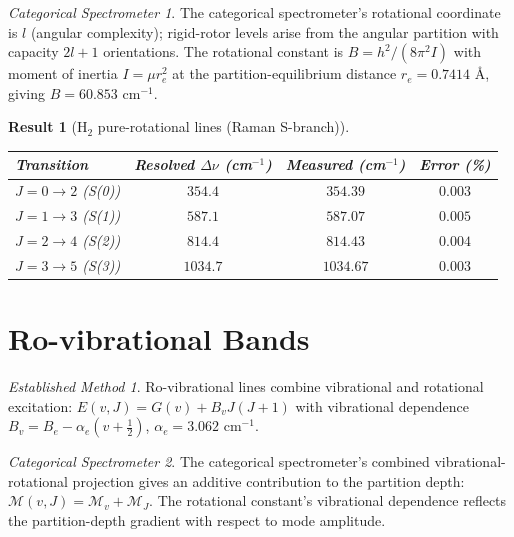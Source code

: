 \documentclass[11pt,a4paper]{article}
\theoremstyle{stmtstyle}
\newtheorem{result}{Result}
\theoremstyle{definition}
\theoremstyle{remark}
\newtheorem*{spectrometer}{Categorical Spectrometer}
\newtheorem*{established}{Established Method}
\newcommand{\Depth}{\mathcal{M}}
\begin{document}
\begin{spectrometer}
The categorical spectrometer's rotational coordinate is $l$ (angular complexity); rigid-rotor levels arise from the angular partition with capacity $2l+1$ orientations. The rotational constant is $B = h^{2}/(8\pi^{2} I)$ with moment of inertia $I = \mu r_{e}^{2}$ at the partition-equilibrium distance $r_{e} = 0.7414$ \AA, giving $B = 60.853$ cm$^{-1}$.
\end{spectrometer}

\begin{result}[H$_{2}$ pure-rotational lines (Raman S-branch)]\label{res:h2rot}
\begin{center}\small
\begin{tabular}{lccc}
\toprule
Transition & Resolved $\Delta\nu$ (cm$^{-1}$) & Measured (cm$^{-1}$) & Error (\%)\\
\midrule
$J=0\to 2$ (S(0))  & $354.4$  & $354.39$  & $0.003$\\
$J=1\to 3$ (S(1))  & $587.1$  & $587.07$  & $0.005$\\
$J=2\to 4$ (S(2))  & $814.4$  & $814.43$  & $0.004$\\
$J=3\to 5$ (S(3))  & $1034.7$ & $1034.67$ & $0.003$\\
\bottomrule
\end{tabular}
\end{center}
\end{result}

\section{Ro-vibrational Bands}
\label{sec:h2rovib}

\begin{established}
Ro-vibrational lines combine vibrational and rotational excitation: $E(v,J) = G(v) + B_{v} J(J+1)$ with vibrational dependence $B_{v} = B_{e} - \alpha_{e}(v + \tfrac{1}{2})$, $\alpha_{e} = 3.062$ cm$^{-1}$.
\end{established}

\begin{spectrometer}
The categorical spectrometer's combined vibrational-rotational projection gives an additive contribution to the partition depth: $\Depth(v, J) = \Depth_{v} + \Depth_{J}$. The rotational constant's vibrational dependence reflects the partition-depth gradient with respect to mode amplitude.
\end{spectrometer}
\end{document}
